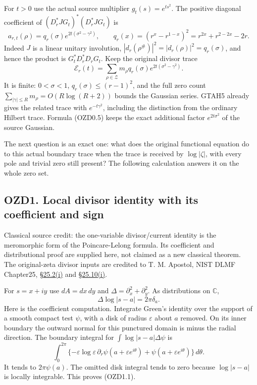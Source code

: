 For \(t>0\) use the actual source multiplier \(g_t(s)=e^{ts^2}\). The
positive diagonal coefficient of \((D_r^*JG_t)^*(D_r^*JG_t)\) is \[
a_{r,t}(\rho)=q_r(\sigma)e^{2t(\sigma^2-\gamma^2)},\qquad
q_r(x)=(r^x-r^{1-x})^2=r^{2x}+r^{2-2x}-2r.
\tag{OZD0.4}
\] Indeed \(J\) is a linear unitary involution,
\(|d_r(\rho^\#)|^2=|d_r(\rho)|^2=q_r(\sigma)\), and hence the product is
\(G_t^*D_r^*D_rG_t\). Keep the original divisor trace \[
\mathcal E_r(t)=\sum_{\rho\in\mathscr Z}m_\rho q_r(\sigma)e^{2t(\sigma^2-\gamma^2)}.
\tag{OZD0.5}
\] It is finite: \(0<\sigma<1\), \(q_r(\sigma)\le(r-1)^2\), and the full
zero count \(\sum_{|\gamma|\le R}m_\rho=O(R\log(R+2))\) bounds the
Gaussian series. GTAH5 already gives the related trace with
\(e^{-t\gamma^2}\), including the distinction from the ordinary Hilbert
trace. Formula (OZD0.5) keeps the exact additional factor
\(e^{2t\sigma^2}\) of the source Gaussian.

The next question is an exact one: what does the original functional
equation do to this actual boundary trace when the trace is received by
\(\log|\zeta|\), with every pole and trivial zero still present? The
following calculation answers it on the whole zero set.

\subsection{OZD1. Local divisor identity with its coefficient and
sign}\label{ozd1.-local-divisor-identity-with-its-coefficient-and-sign}

Classical source credit: the one-variable divisor/current identity is
the meromorphic form of the Poincare-Lelong formula. Its coefficient and
distributional proof are supplied here, not claimed as a new classical
theorem. The original-zeta divisor inputs are credited to T. M. Apostol,
NIST DLMF Chapter25, \href{https://dlmf.nist.gov/25.2\#i}{§25.2(i)} and
\href{https://dlmf.nist.gov/25.10\#i}{§25.10(i)}.

For \(s=x+iy\) use \(dA=dx\,dy\) and
\(\Delta=\partial_x^2+\partial_y^2\). As distributions on \(\mathbb C\),
\[
\Delta\log|s-a|=2\pi\delta_a.
\tag{OZD1.1}
\] Here is the coefficient computation. Integrate Green's identity over
the support of a smooth compact test \(\psi\), with a disk of radius
\(\varepsilon\) about \(a\) removed. On its inner boundary the outward
normal for this punctured domain is minus the radial direction. The
boundary integral for \(\int\log|s-a|\Delta\psi\) is \[
\int_0^{2\pi}\{-\varepsilon\log\varepsilon\,\partial_r\psi(a+\varepsilon e^{i\theta})
+\psi(a+\varepsilon e^{i\theta})\}\,d\theta.
\] It tends to \(2\pi\psi(a)\). The omitted disk integral tends to zero
because \(\log|s-a|\) is locally integrable. This proves (OZD1.1).


